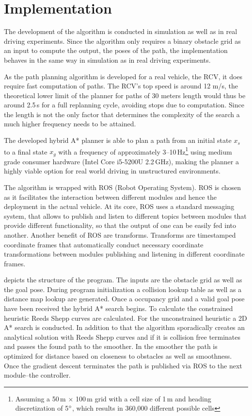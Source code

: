\chapter{Implementation}
The development of the algorithm is conducted in simulation as well as in real driving experiments. Since the algorithm only requires a binary obstacle grid as an input to compute the output, the poses of the path, the implementation behaves in the same way in simulation as in real driving experiments.

As the path planning algorithm is developed for a real vehicle, the RCV, it does require fast computation of paths. The RCV's top speed is around 12 m/s, the theoretical lower limit of the planner for paths of 30 meters length would thus be around 2.5\,s for a full replanning cycle, avoiding stops due to computation. Since the length is not the only factor that determines the complexity of the search a much higher frequency needs to be attained.

The developed hybrid A* planner is able to plan a path from an initial state $x_s$ to a final state $x_g$ with a frequency of approximately 3--10\,Hz\footnote{\label{fot:grid}Assuming a 50\,m $\times$ 100\,m grid with a cell size of 1\,m and heading discretization of 5$\degree$, which results in 360,000 different possible cells} using medium grade consumer hardware (Intel Core i5-5200U 2.2\,GHz), making the planner a highly viable option for real world driving in unstructured environments.

The algorithm is wrapped with ROS (Robot Operating System). ROS is chosen as it facilitates the interaction between different modules and hence the deployment in the actual vehicle. At its core, ROS uses a standard messaging system, that allows to publish and listen to different topics between modules that provide different functionality, so that the output of one can be easily fed into another. Another benefit of ROS are transforms. Transforms are timestamped coordinate frames that automatically conduct necessary coordinate transformations between modules publishing and listening in different coordinate frames.

 depicts the structure of the program. The inputs are the obstacle grid as well as the goal pose. During program initialization a collision lookup table as well as a distance map lookup are generated. Once a occupancy grid and a valid goal pose have been received the hybrid A* search begins. To calculate the constrained heuristic Reeds Shepp curves are calculated. For the unconstrained heuristic a 2D A* search is conducted. In addition to that the algorithm sporadically creates an analytical solution with Reeds Shepp curves and if it is collision free terminates and passes the found path to the smoother. In the smoother the path is optimized for distance based on closeness to obstacles as well as smoothness. Once the gradient descent terminates the path is published via ROS to the next module--the controller.

